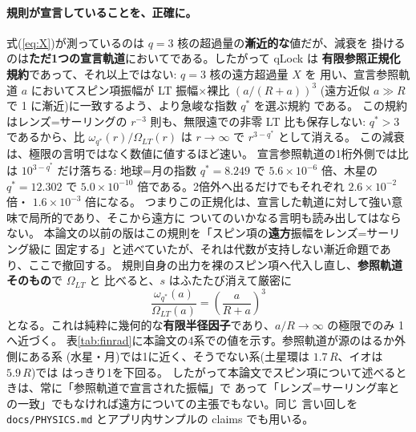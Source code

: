 \documentclass[a4paper,10pt,twocolumn]{ltjsarticle}
\begin{document}
\paragraph*{規則が宣言していることを、正確に。}
式(\ref{eq:X})が測っているのは $q=3$ 核の超過量の\textbf{漸近的な}値だが、減衰を
掛けるのは\textbf{ただ1つの宣言軌道}においてである。したがって qLock は
\textbf{有限参照正規化規約}であって、それ以上ではない: $q=3$ 核の遠方超過量 $X$ を
用い、宣言参照軌道 $a$ においてスピン項振幅が LT 振幅×裸比 $(a/(R+a))^{3}$
(遠方近似 $a\gg R$ で 1 に漸近)に一致するよう、より急峻な指数 $q^{*}$ を選ぶ規約
である。
この規約はレンズ=サーリングの $r^{-3}$ 則も、無限遠での非零 LT 比も保存しない:
$q^{*}>3$ であるから、比 $\omega_{q^{*}}(r)/\Omega_{LT}(r)$ は $r\to\infty$ で
$r^{3-q^{*}}$ として消える。
この減衰は、極限の言明ではなく数値に値するほど速い。
宣言参照軌道の1桁外側では比は $10^{3-q^{*}}$ だけ落ちる: 地球=月の指数
$q^{*}=8.249$ で $5.6\times10^{-6}$ 倍、木星の $q^{*}=12.302$ で
$5.0\times10^{-10}$ 倍である。2倍外へ出るだけでもそれぞれ $2.6\times10^{-2}$ 倍・
$1.6\times10^{-3}$ 倍になる。
つまりこの正規化は、宣言した軌道に対して強い意味で局所的であり、そこから遠方に
ついてのいかなる言明も読み出してはならない。
本論文の以前の版はこの規則を「スピン項の\textbf{遠方}振幅をレンズ=サーリング級に
固定する」と述べていたが、それは代数が支持しない漸近命題であり、ここで撤回する。
規則自身の出力を裸のスピン項へ代入し直し、\textbf{参照軌道そのもの}で $\Omega_{LT}$ と
比べると、$s$ はふたたび消えて厳密に
\begin{equation}
  \frac{\omega_{q^{*}}(a)}{\Omega_{LT}(a)}
    = \left(\frac{a}{R+a}\right)^{3}
  \label{eq:finrad}
\end{equation}
となる。これは純粋に幾何的な\textbf{有限半径因子}であり、$a/R\to\infty$ の極限でのみ
1へ近づく。
表\ref{tab:finrad}に本論文の4系での値を示す。参照軌道が源のはるか外側にある系
(水星・月)では1に近く、そうでない系(土星環は $1.7\,R$、イオは $5.9\,R$)では
はっきり1を下回る。
したがって本論文でスピン項について述べるときは、常に「参照軌道で宣言された振幅」で
あって「レンズ=サーリング率との一致」でもなければ遠方についての主張でもない。同じ
言い回しを \texttt{docs/PHYSICS.md} とアプリ内サンプルの claims でも用いる。
\end{document}
